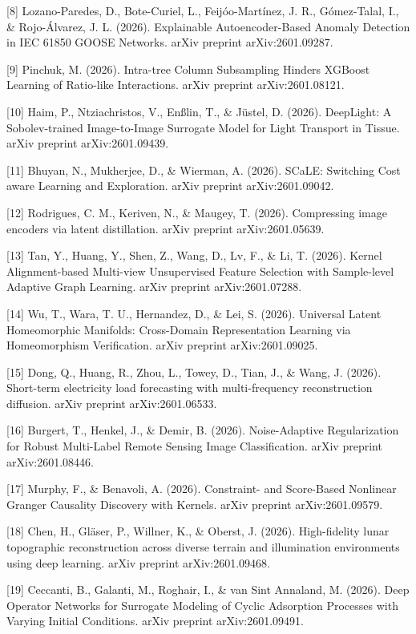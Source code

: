 \documentclass{article}
\begin{document}
[8] Lozano-Paredes, D., Bote-Curiel, L., Feijóo-Martínez, J. R., Gómez-Talal, I., \& Rojo-Álvarez, J. L. (2026). Explainable Autoencoder-Based Anomaly Detection in IEC 61850 GOOSE Networks. arXiv preprint arXiv:2601.09287.

[9] Pinchuk, M. (2026). Intra-tree Column Subsampling Hinders XGBoost Learning of Ratio-like Interactions. arXiv preprint arXiv:2601.08121.

[10] Haim, P., Ntziachristos, V., Enßlin, T., \& Jüstel, D. (2026). DeepLight: A Sobolev-trained Image-to-Image Surrogate Model for Light Transport in Tissue. arXiv preprint arXiv:2601.09439.

[11] Bhuyan, N., Mukherjee, D., \& Wierman, A. (2026). SCaLE: Switching Cost aware Learning and Exploration. arXiv preprint arXiv:2601.09042.

[12] Rodrigues, C. M., Keriven, N., \& Maugey, T. (2026). Compressing image encoders via latent distillation. arXiv preprint arXiv:2601.05639.

[13] Tan, Y., Huang, Y., Shen, Z., Wang, D., Lv, F., \& Li, T. (2026). Kernel Alignment-based Multi-view Unsupervised Feature Selection with Sample-level Adaptive Graph Learning. arXiv preprint arXiv:2601.07288.

[14] Wu, T., Wara, T. U., Hernandez, D., \& Lei, S. (2026). Universal Latent Homeomorphic Manifolds: Cross-Domain Representation Learning via Homeomorphism Verification. arXiv preprint arXiv:2601.09025.

[15] Dong, Q., Huang, R., Zhou, L., Towey, D., Tian, J., \& Wang, J. (2026). Short-term electricity load forecasting with multi-frequency reconstruction diffusion. arXiv preprint arXiv:2601.06533.

[16] Burgert, T., Henkel, J., \& Demir, B. (2026). Noise-Adaptive Regularization for Robust Multi-Label Remote Sensing Image Classification. arXiv preprint arXiv:2601.08446.

[17] Murphy, F., \& Benavoli, A. (2026). Constraint- and Score-Based Nonlinear Granger Causality Discovery with Kernels. arXiv preprint arXiv:2601.09579.

[18] Chen, H., Gläser, P., Willner, K., \& Oberst, J. (2026). High-fidelity lunar topographic reconstruction across diverse terrain and illumination environments using deep learning. arXiv preprint arXiv:2601.09468.

[19] Ceccanti, B., Galanti, M., Roghair, I., \& van Sint Annaland, M. (2026). Deep Operator Networks for Surrogate Modeling of Cyclic Adsorption Processes with Varying Initial Conditions. arXiv preprint arXiv:2601.09491.
\end{document}
